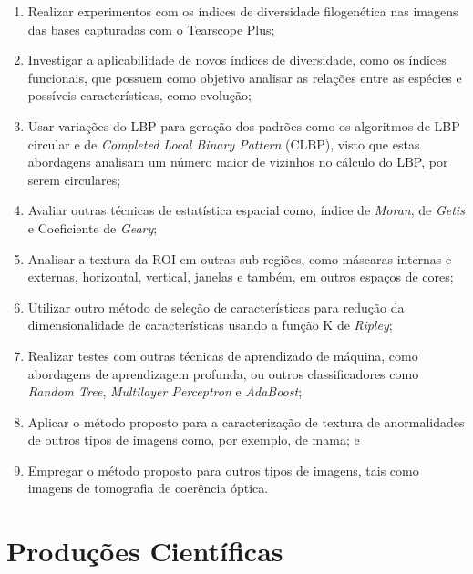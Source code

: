 \begin{enumerate}
    \item Realizar experimentos com os índices de diversidade filogenética nas imagens das bases capturadas com o Tearscope Plus;
    
    \item Investigar a aplicabilidade de novos índices de diversidade, como os índices funcionais, que possuem como objetivo analisar as relações entre as espécies e possíveis características, como evolução;
    
    \item Usar variações do LBP para geração dos padrões como os algoritmos de LBP circular e de
    \textit{Completed Local Binary Pattern} (CLBP), visto que estas abordagens analisam um número maior de vizinhos no cálculo do LBP, por serem circulares;
    
    \item Avaliar outras técnicas de estatística espacial como, índice de \textit{Moran}, de \textit{Getis} e Coeficiente de \textit{Geary};
    
    \item Analisar a textura da ROI em outras sub-regiões, como máscaras internas e externas, horizontal, vertical, janelas e também, em outros espaços de cores;
    
    \item Utilizar outro método de seleção de características para redução da dimensionalidade de características usando a função K de \textit{Ripley};
    
    \item Realizar testes com outras técnicas de aprendizado de máquina, como abordagens de aprendizagem profunda, ou outros classificadores como \textit{Random Tree}, \textit{Multilayer Perceptron} e \textit{AdaBoost};
    
    \item Aplicar o método proposto para a caracterização de textura de anormalidades de outros tipos de imagens como, por exemplo, de mama; e
    
    \item Empregar o método proposto para outros tipos de imagens, tais como imagens de tomografia de coerência óptica.
    
\end{enumerate}

\section{Produções Científicas}

